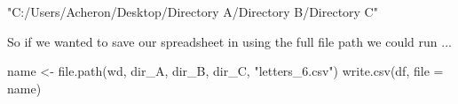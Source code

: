 \begin{outR}
"C:/Users/Acheron/Desktop/Directory A/Directory B/Directory C" 
\end{outR}

\noindent
So if we wanted to save our spreadsheet in  using the full file path we could run ...

\begin{inR}
name <- file.path(wd, dir_A, dir_B, dir_C, "letters_6.csv")
write.csv(df, file = name)
\end{inR}

\vspace{2em}

